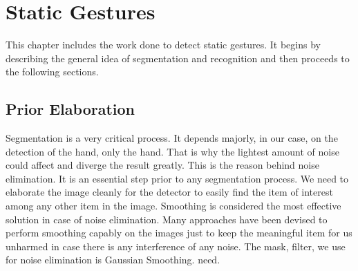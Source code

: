 \section{Static Gestures}
This chapter includes the work done to detect static gestures. It begins by describing the general idea of segmentation and recognition and then proceeds to the following sections.\bigskip


\subsection{Prior Elaboration}
Segmentation is a very critical process. It depends majorly, in our case, on the detection of the hand, only the hand. That is why the lightest amount of noise could affect and diverge the result greatly. This is the reason behind noise elimination. It is an essential step prior to any segmentation process. We need to elaborate the image cleanly for the detector to easily find the item of interest among any other item in the image. Smoothing is considered the most effective solution in case of noise elimination. Many approaches have been devised to perform smoothing capably on the images just to keep the meaningful item for us unharmed in case there is any interference of any noise. The mask, filter, we use for noise elimination is Gaussian Smoothing.
need.\bigskip

